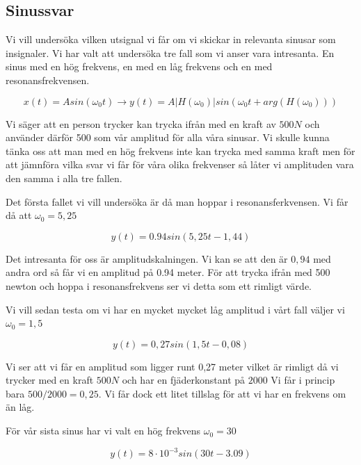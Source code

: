 \documentclass[10pt,a4paper]{article}
\begin{document}
\subsection{Sinussvar}
Vi vill undersöka vilken utsignal vi får om vi skickar in relevanta sinusar som insignaler. Vi har valt att undersöka tre fall som vi anser vara intresanta. En sinus med en hög frekvens, en med en låg frekvens och en med resonansfrekvensen.

\begin{equation}
x(t) = A sin(\omega_0t) \rightarrow y(t) = A|H(\omega_0)|sin(\omega_0t + arg(H(\omega_0)))
\end{equation}

Vi säger att en person trycker kan trycka ifrån med en kraft av $500N$ och använder därför 500 som vår amplitud för alla våra sinusar. Vi skulle kunna tänka oss att man med en hög frekvens inte kan trycka med samma kraft men för att jämnföra vilka svar vi får för våra olika frekvenser så låter vi amplituden vara den samma i alla tre fallen.

Det första fallet vi vill undersöka är då man hoppar i resonansferkvensen. Vi får då att $\omega_0 = 5,25$

\begin{equation}
y(t) = 0.94 sin(5,25 t - 1,44)
\end{equation}

Det intresanta för oss är amplitudskalningen. Vi kan se att den är $0,94$ med andra ord så får vi en amplitud på 0.94 meter. För att trycka ifrån med 500 newton och hoppa i resonansfrekvens ser vi detta som ett rimligt värde.

Vi vill sedan testa om vi har en mycket mycket låg amplitud i vårt fall väljer vi $\omega_0 = 1,5$

\begin{equation}
y(t) = 0,27 sin(1,5 t - 0,08)
\end{equation}

Vi ser att vi får en amplitud som ligger runt 0,27 meter vilket är rimligt då vi trycker med en kraft $500N$ och har en fjäderkonstant på $2000$ Vi får i princip bara $500/2000 = 0,25$. Vi får dock ett litet tillslag för att vi har en frekvens om än låg.

För vår sista sinus har vi valt en hög frekvens $\omega_0 = 30$

\begin{equation}
y(t) = 8\cdot 10^{-3} sin(30 t - 3.09)
\end{equation}
\end{document}
